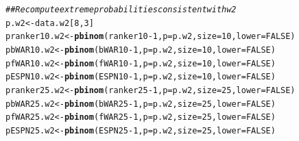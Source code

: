 \documentclass[11pt]{article}\usepackage[]{graphicx}\usepackage[]{color}
\makeatletter
\newcommand{\hlnum}[1]{\textcolor[rgb]{0.686,0.059,0.569}{#1}}%
\newcommand{\hlcom}[1]{\textcolor[rgb]{0.678,0.584,0.686}{\textit{#1}}}%
\newcommand{\hlopt}[1]{\textcolor[rgb]{0,0,0}{#1}}%
\newcommand{\hlstd}[1]{\textcolor[rgb]{0.345,0.345,0.345}{#1}}%
\newcommand{\hlkwb}[1]{\textcolor[rgb]{0.69,0.353,0.396}{#1}}%
\newcommand{\hlkwc}[1]{\textcolor[rgb]{0.333,0.667,0.333}{#1}}%
\newcommand{\hlkwd}[1]{\textcolor[rgb]{0.737,0.353,0.396}{\textbf{#1}}}%
\newenvironment{kframe}{%
 \def\at@end@of@kframe{}%
 \ifinner\ifhmode%
  \def\at@end@of@kframe{\end{minipage}}%
  \begin{minipage}{\columnwidth}%
 \fi\fi%
 \def\FrameCommand##1{\hskip\@totalleftmargin \hskip-\fboxsep
 \colorbox{shadecolor}{##1}\hskip-\fboxsep
     \hskip-\linewidth \hskip-\@totalleftmargin \hskip\columnwidth}%
 \MakeFramed {\advance\hsize-\width
   \@totalleftmargin\z@ \linewidth\hsize
   \@setminipage}}%
 {\par\unskip\endMakeFramed%
 \at@end@of@kframe}
\newenvironment{knitrout}{}{} %
\makeatother
\begin{document}
\begin{knitrout}
\begin{kframe}
\begin{alltt}
\hlcom{## Recompute extreme probabilities consistent with w2}
\hlstd{p.w2} \hlkwb{<-} \hlstd{data.w2[}\hlnum{8}\hlstd{,} \hlnum{3}\hlstd{]}
\hlstd{pranker10.w2} \hlkwb{<-} \hlkwd{pbinom}\hlstd{(ranker10} \hlopt{-} \hlnum{1}\hlstd{,} \hlkwc{p} \hlstd{= p.w2,} \hlkwc{size} \hlstd{=} \hlnum{10}\hlstd{,} \hlkwc{lower} \hlstd{=} \hlnum{FALSE}\hlstd{)}
\hlstd{pbWAR10.w2}   \hlkwb{<-} \hlkwd{pbinom}\hlstd{(bWAR10} \hlopt{-} \hlnum{1}\hlstd{,} \hlkwc{p} \hlstd{= p.w2,} \hlkwc{size} \hlstd{=} \hlnum{10}\hlstd{,} \hlkwc{lower} \hlstd{=} \hlnum{FALSE}\hlstd{)}
\hlstd{pfWAR10.w2}   \hlkwb{<-} \hlkwd{pbinom}\hlstd{(fWAR10} \hlopt{-} \hlnum{1}\hlstd{,} \hlkwc{p} \hlstd{= p.w2,} \hlkwc{size} \hlstd{=} \hlnum{10}\hlstd{,} \hlkwc{lower} \hlstd{=} \hlnum{FALSE}\hlstd{)}
\hlstd{pESPN10.w2}   \hlkwb{<-} \hlkwd{pbinom}\hlstd{(ESPN10} \hlopt{-} \hlnum{1}\hlstd{,} \hlkwc{p} \hlstd{= p.w2,} \hlkwc{size} \hlstd{=} \hlnum{10}\hlstd{,} \hlkwc{lower} \hlstd{=} \hlnum{FALSE}\hlstd{)}
\hlstd{pranker25.w2} \hlkwb{<-} \hlkwd{pbinom}\hlstd{(ranker25} \hlopt{-} \hlnum{1}\hlstd{,} \hlkwc{p} \hlstd{= p.w2,} \hlkwc{size} \hlstd{=} \hlnum{25}\hlstd{,} \hlkwc{lower} \hlstd{=} \hlnum{FALSE}\hlstd{)}
\hlstd{pbWAR25.w2}   \hlkwb{<-} \hlkwd{pbinom}\hlstd{(bWAR25} \hlopt{-} \hlnum{1}\hlstd{,} \hlkwc{p} \hlstd{= p.w2,} \hlkwc{size} \hlstd{=} \hlnum{25}\hlstd{,} \hlkwc{lower} \hlstd{=} \hlnum{FALSE}\hlstd{)}
\hlstd{pfWAR25.w2}   \hlkwb{<-} \hlkwd{pbinom}\hlstd{(fWAR25} \hlopt{-} \hlnum{1}\hlstd{,} \hlkwc{p} \hlstd{= p.w2,} \hlkwc{size} \hlstd{=} \hlnum{25}\hlstd{,} \hlkwc{lower} \hlstd{=} \hlnum{FALSE}\hlstd{)}
\hlstd{pESPN25.w2}   \hlkwb{<-} \hlkwd{pbinom}\hlstd{(ESPN25} \hlopt{-} \hlnum{1}\hlstd{,} \hlkwc{p} \hlstd{= p.w2,} \hlkwc{size} \hlstd{=} \hlnum{25}\hlstd{,} \hlkwc{lower} \hlstd{=} \hlnum{FALSE}\hlstd{)}


\end{alltt}
\end{kframe}
\end{knitrout}
\end{document}
